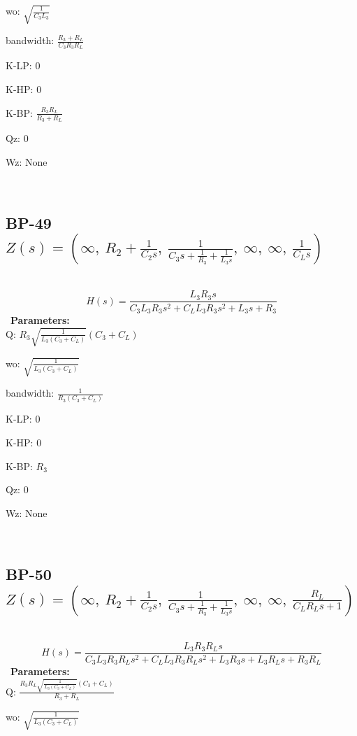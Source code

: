 \documentclass{article}
\begin{document}
wo: $\sqrt{\frac{1}{C_{3} L_{3}}}$\ 

bandwidth: $\frac{R_{3} + R_{L}}{C_{3} R_{3} R_{L}}$\ 

K-LP: $0$\ 

K-HP: $0$\ 

K-BP: $\frac{R_{3} R_{L}}{R_{3} + R_{L}}$\ 

Qz: $0$\ 

Wz: $\text{None}$\ 

\ 

\subsection{BP-49 $Z(s) = \left( \infty, \  R_{2} + \frac{1}{C_{2} s}, \  \frac{1}{C_{3} s + \frac{1}{R_{3}} + \frac{1}{L_{3} s}}, \  \infty, \  \infty, \  \frac{1}{C_{L} s}\right)$ } \ 
\textbf{\[H(s) = \frac{L_{3} R_{3} s}{C_{3} L_{3} R_{3} s^{2} + C_{L} L_{3} R_{3} s^{2} + L_{3} s + R_{3}}\] } \ 
\textbf{Parameters:}\\ 

Q: $R_{3} \sqrt{\frac{1}{L_{3} \left(C_{3} + C_{L}\right)}} \left(C_{3} + C_{L}\right)$\ 

wo: $\sqrt{\frac{1}{L_{3} \left(C_{3} + C_{L}\right)}}$\ 

bandwidth: $\frac{1}{R_{3} \left(C_{3} + C_{L}\right)}$\ 

K-LP: $0$\ 

K-HP: $0$\ 

K-BP: $R_{3}$\ 

Qz: $0$\ 

Wz: $\text{None}$\ 

\ 

\subsection{BP-50 $Z(s) = \left( \infty, \  R_{2} + \frac{1}{C_{2} s}, \  \frac{1}{C_{3} s + \frac{1}{R_{3}} + \frac{1}{L_{3} s}}, \  \infty, \  \infty, \  \frac{R_{L}}{C_{L} R_{L} s + 1}\right)$ } \ 
\textbf{\[H(s) = \frac{L_{3} R_{3} R_{L} s}{C_{3} L_{3} R_{3} R_{L} s^{2} + C_{L} L_{3} R_{3} R_{L} s^{2} + L_{3} R_{3} s + L_{3} R_{L} s + R_{3} R_{L}}\] } \ 
\textbf{Parameters:}\\ 

Q: $\frac{R_{3} R_{L} \sqrt{\frac{1}{L_{3} \left(C_{3} + C_{L}\right)}} \left(C_{3} + C_{L}\right)}{R_{3} + R_{L}}$\ 

wo: $\sqrt{\frac{1}{L_{3} \left(C_{3} + C_{L}\right)}}$\ 
\end{document}
